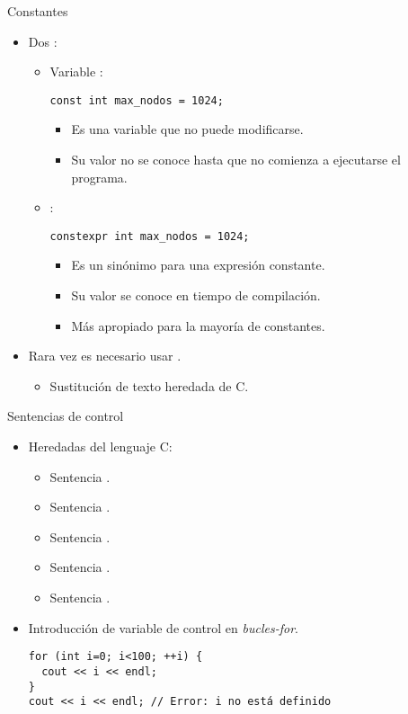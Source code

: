 \begin{frame}[t,fragile]{Constantes}
\begin{itemize}
\item Dos :
  \begin{itemize}

    \item Variable :
\begin{lstlisting}
const int max_nodos = 1024;
\end{lstlisting}
      \begin{itemize}
        \item Es una variable que no puede modificarse.
        \item Su valor no se conoce hasta que no comienza a ejecutarse el programa.
      \end{itemize}

    \item {}:
\begin{lstlisting}
constexpr int max_nodos = 1024;
\end{lstlisting}
      \begin{itemize}
        \item Es un sinónimo para una expresión constante.
        \item Su valor se conoce en tiempo de compilación.
        \item Más apropiado para la mayoría de constantes.
      \end{itemize}
  \end{itemize}

  \item Rara vez es necesario usar .
    \begin{itemize}
      \item Sustitución de texto heredada de C.
    \end{itemize}
\end{itemize}
\end{frame}

\begin{frame}[t,fragile]{Sentencias de control}
\begin{itemize}
  \item Heredadas del lenguaje C:
    \begin{itemize}
      \item Sentencia .
      \item Sentencia .
      \item Sentencia .
      \item Sentencia .
      \item Sentencia .
    \end{itemize}
  \item Introducción de variable de control en \emph{bucles-for}.
\begin{lstlisting}
for (int i=0; i<100; ++i) {
  cout << i << endl;
}
cout << i << endl; // Error: i no está definido
\end{lstlisting}
\end{itemize}
\end{frame}

